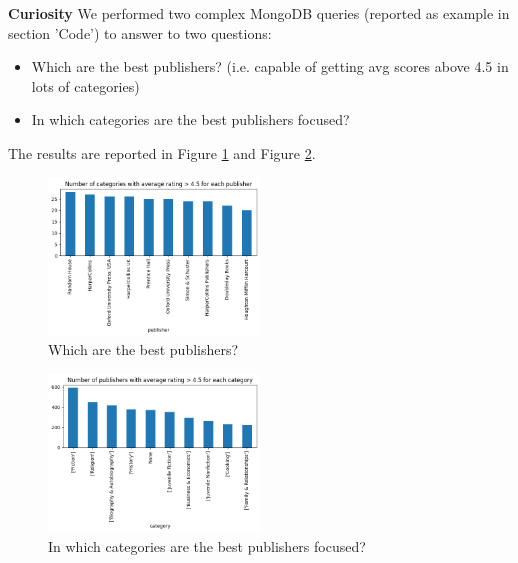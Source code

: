 \vspace{0.5cm}
\noindent 
\textbf{Curiosity}
We performed two complex MongoDB queries (reported as example in section 'Code') to answer to two questions:\\
\begin{itemize}
    \item Which are the best publishers? (i.e. capable of getting avg scores above 4.5 in lots of categories)
    \item In which categories are the best publishers focused?
\end{itemize}

The results are reported in Figure \ref{fig:h6_which_best} and Figure \ref{fig:h6_where_best}.

\begin{figure}[H]
    \centering
    \includegraphics[width=0.5\textwidth]{./figures/h6_which_best.png}
    \caption{Which are the best publishers?}
    \label{fig:h6_which_best}
\end{figure}

\begin{figure}[H]
    \centering
    \includegraphics[width=0.5\textwidth]{./figures/h6_where_best.png}
    \caption{In which categories are the best publishers focused?}
    \label{fig:h6_where_best}
\end{figure}